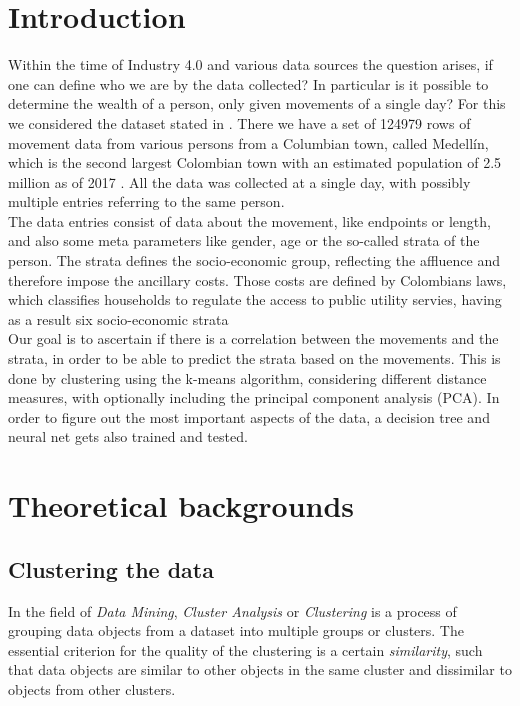 \documentclass[runningheads]{llncs}
\begin{document}
	\section{Introduction} \label{sec: introduction}
	Within the time of Industry 4.0 and various data sources the question arises, if one can define who we are by the data collected? In particular is it possible to determine the wealth of a person, only given movements of a single day?
	For this we considered the dataset stated in \cite{rich_do_not_rise_early}. There we have a set of 124979 rows of movement data from various persons from a Columbian town, called Medellín, which is the second largest Colombian town with an estimated population of 2.5 million as of 2017 \cite{population_number} . All the data was collected at a single day, with possibly multiple entries referring to the same person.\\
	The data entries consist of data about the movement, like endpoints or length, and also some meta parameters like gender, age or the so-called strata of the person. The strata defines the socio-economic group, reflecting the affluence and therefore impose the ancillary costs. Those costs are defined by Colombians laws, which classifies households to regulate the access to public utility servies, having as a result six socio-economic strata \cite{rich_do_not_rise_early}\\
	Our goal is to ascertain if there is a correlation between the movements and the strata, in order to be able to predict the strata based on the movements. This is done by clustering using the k-means algorithm, considering different distance measures, with optionally including the principal component analysis (PCA). In order to figure out the most important aspects of the data, a decision tree and neural net gets also trained and tested.
	
	\section{Theoretical backgrounds}
	
	\subsection{Clustering the data}
	
	In the field of \textit{Data Mining}, \textit{Cluster Analysis} or \textit{Clustering} is a process of grouping data objects from a dataset into multiple groups or clusters. The essential criterion for the quality of the clustering is a certain \textit{similarity}, such that data objects are similar to other objects in the same cluster and dissimilar to objects from other clusters. 
	
\end{document}

